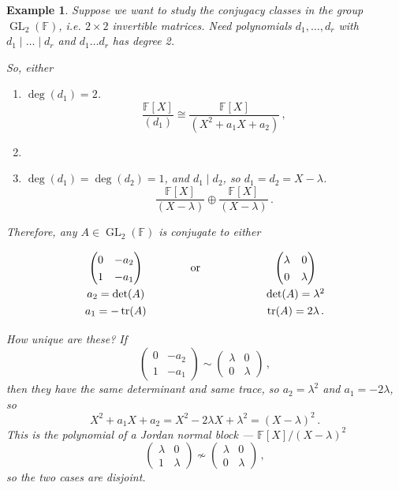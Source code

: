 \documentclass{article}
\theoremstyle{plain}\theoremheaderfont{\normalfont\itshape}\theorembodyfont{\rmfamily}\theoremseparator{.}\newtheorem*{rem}{Remark}\newtheorem*{ex}{Example}\newtheorem*{proof}{Proof}\newtheorem*{altp}{Alternative proof}\newtheorem*{nonex}{Non-Example}
\theoremstyle{plain}\theoremheaderfont{\normalfont\bfseries}\theorembodyfont{\rmfamily}\theoremseparator{.}\newtheorem{thm}{Theorem}[section]\newtheorem{lem}[thm]{Lemma}\newtheorem{prop}[thm]{Proposition}\newtheorem*{cor}{Corollary}\newtheorem{defn}[thm]{Definition}\newtheorem{clm}[thm]{Claim}\newtheorem{clminproof}{Claim}\newtheorem*{notn}{Notation}\newtheorem*{exer}{Exercise}\newtheorem*{lemnn}{Lemma}
\theoremstyle{break}\theoremheaderfont{\normalfont\itshape}\theorembodyfont{\rmfamily}\theoremseparator{.\medskip}\newtheorem*{proofskip}{Proof}\newtheorem*{exs}{Examples}\newtheorem*{rems}{Remarks}\newtheorem*{obs}{Observations}
\theoremstyle{break}\theoremheaderfont{\normalfont\bfseries}\theorembodyfont{\rmfamily}\theoremseparator{.\medskip}\newtheorem{lemskip}[thm]{Lemma}\newtheorem{defnskip}[thm]{Definition}\newtheorem{propskip}[thm]{Proposition}\newtheorem{thmskip}[thm]{Theorem}
\numberwithin{equation}{section}
\DeclareMathOperator{\GL}{GL}
\DeclareMathOperator{\tr}{tr}
\newcommand{\FF}{\mathbb{F}}
\begin{document}
    \begin{ex}
        Suppose we want to study the conjugacy classes in the group \(\GL_2(\FF)\), i.e. \(2\times 2\) invertible matrices. Need polynomials \(d_1,\dots, d_r\) with \(d_1\mid \dots\mid d_r\) and \(d_1\dots d_r\) has degree 2.

        So, either
        \begin{enumerate}[topsep=0pt,label=(\roman*)]
            \item \(\deg(d_1)=2\).
            \[\frac{\FF[X]}{(d_1)}\cong\frac{\FF[X]}{(X^2+a_1X+a_2)}\,,\]
            \item[or]
            \item \(\deg(d_1)=\deg(d_2)=1\), and \(d_1\mid d_2\), so \(d_1=d_2=X-\lambda\).
            \[\frac{\FF[X]}{(X-\lambda)}\oplus\frac{\FF[X]}{(X-\lambda)}\,.\]
        \end{enumerate}
        Therefore, any \(A\in\GL_2(\FF)\) is conjugate to either

        \[\def\arraystretch{1.3}
        \begin{array}{cccc}
            \begin{pmatrix}
                    0 & -a_2\\
                    1 & -a_1
            \end{pmatrix} & \quad\qquad\text{or} &\qquad\qquad & \begin{pmatrix}
                \lambda & 0 \\
                0 & \lambda
            \end{pmatrix} \\
            a_2=\det(A) & & & \det(A)=\lambda^2\\
            a_1=-\tr(A) & & & \tr(A)=2\lambda\,.
        \end{array}\]

        How unique are these? If
        \[\begin{pmatrix}
            0 & -a_2\\
            1 & -a_1
        \end{pmatrix}\sim\begin{pmatrix}
            \lambda & 0\\
            0 & \lambda
        \end{pmatrix}\,,\]
        then they have the same determinant and same trace, so \(a_2=\lambda^2\) and \(a_1=-2\lambda\), so
        \[X^2+a_1X+a_2=X^2-2\lambda X+\lambda^2=(X-\lambda)^2\,.\]
        This is the polynomial of a Jordan normal block --- \(\FF[X]/(X-\lambda)^2\)
        \[\begin{pmatrix}
            \lambda & 0 \\
            1 & \lambda
        \end{pmatrix}\not\sim\begin{pmatrix}
            \lambda & 0 \\
            0 & \lambda
        \end{pmatrix}\,,\]  
        so the two cases are disjoint.


\end{ex}
\end{document}
